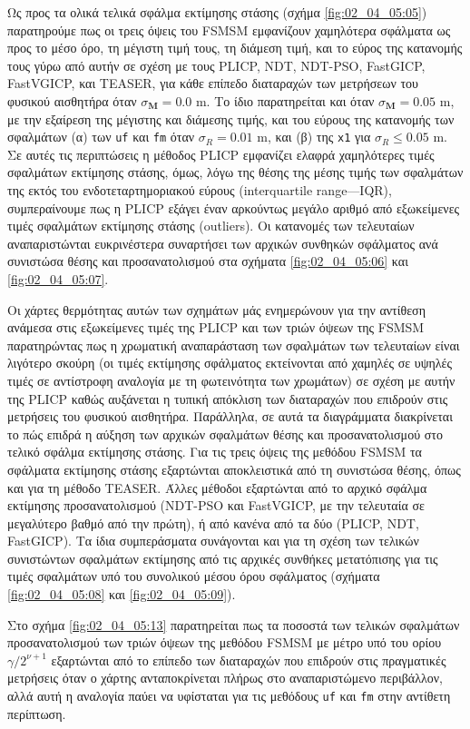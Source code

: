 Ως προς τα ολικά τελικά σφάλμα εκτίμησης στάσης (σχήμα \ref{fig:02_04_05:05})
παρατηρούμε πως οι τρεις όψεις του FSMSM εμφανίζουν χαμηλότερα σφάλματα ως προς
το μέσο όρο, τη μέγιστη τιμή τους, τη διάμεση τιμή, και το εύρος της κατανομής
τους γύρω από αυτήν σε σχέση με τους PLICP, NDT, NDT-PSO, FastGICP, FastVGICP,
και TEASER, για κάθε επίπεδο διαταραχών των μετρήσεων του φυσικού αισθητήρα
όταν $\sigma_{\bm{M}} = 0.0$ m. Το ίδιο παρατηρείται και όταν $\sigma_{\bm{M}}
= 0.05$ m, με την εξαίρεση της μέγιστης και διάμεσης τιμής, και του εύρους της
κατανομής των σφαλμάτων (α) των \texttt{uf} και \texttt{fm} όταν $\sigma_R =
0.01$ m, και (β) της \texttt{x1} για $\sigma_R \leq 0.05$ m. Σε αυτές τις
περιπτώσεις η μέθοδος PLICP εμφανίζει ελαφρά χαμηλότερες τιμές σφαλμάτων
εκτίμησης στάσης, όμως, λόγω της θέσης της μέσης τιμής των σφαλμάτων της εκτός
του ενδοτεταρτημοριακού εύρους (interquartile range---IQR), συμπεραίνουμε πως η
PLICP εξάγει έναν αρκούντως μεγάλο αριθμό από εξωκείμενες τιμές σφαλμάτων
εκτίμησης στάσης (outliers). Οι κατανομές των τελευταίων αναπαριστώνται
ευκρινέστερα συναρτήσει των αρχικών συνθηκών σφάλματος ανά συνιστώσα θέσης και
προσανατολισμού στα σχήματα \ref{fig:02_04_05:06} και \ref{fig:02_04_05:07}.

Οι χάρτες θερμότητας αυτών των σχημάτων μάς ενημερώνουν για την αντίθεση
ανάμεσα στις εξωκείμενες τιμές της PLICP και των τριών όψεων της FSMSM
παρατηρώντας πως η χρωματική αναπαράσταση των σφαλμάτων των τελευταίων είναι
λιγότερο σκούρη (οι τιμές εκτίμησης σφάλματος εκτείνονται από χαμηλές σε υψηλές
τιμές σε αντίστροφη αναλογία με τη φωτεινότητα των χρωμάτων) σε σχέση με αυτήν
της PLICP καθώς αυξάνεται η τυπική απόκλιση των διαταραχών που επιδρούν στις
μετρήσεις του φυσικού αισθητήρα. Παράλληλα, σε αυτά τα διαγράμματα διακρίνεται
το πώς επιδρά η αύξηση των αρχικών σφαλμάτων θέσης και προσανατολισμού στο
τελικό σφάλμα εκτίμησης στάσης. Για τις τρεις όψεις της μεθόδου FSMSM τα
σφάλματα εκτίμησης στάσης εξαρτώνται αποκλειστικά από τη συνιστώσα θέσης, όπως
και για τη μέθοδο TEASER. Άλλες μέθοδοι εξαρτώνται από το αρχικό σφάλμα
εκτίμησης προσανατολισμού (NDT-PSO και FastVGICP, με την τελευταία σε
μεγαλύτερο βαθμό από την πρώτη), ή από κανένα από τα δύο (PLICP, NDT,
FastGICP). Τα ίδια συμπεράσματα συνάγονται και για τη σχέση των τελικών
συνιστώντων σφαλμάτων εκτίμησης από τις αρχικές συνθήκες μετατόπισης για τις
τιμές σφαλμάτων υπό του συνολικού μέσου όρου σφάλματος (σχήματα
\ref{fig:02_04_05:08} και \ref{fig:02_04_05:09}).

Στο σχήμα \ref{fig:02_04_05:13} παρατηρείται πως τα ποσοστά των τελικών
σφαλμάτων προσανατολισμού των τριών όψεων της μεθόδου FSMSM με μέτρο υπό του
ορίου $\gamma / 2^{\nu+1}$ εξαρτώνται από το επίπεδο των διαταραχών που
επιδρούν στις πραγματικές μετρήσεις όταν ο χάρτης ανταποκρίνεται πλήρως στο
αναπαριστώμενο περιβάλλον, αλλά αυτή η αναλογία παύει να υφίσταται για τις
μεθόδους \texttt{uf} και \texttt{fm} στην αντίθετη περίπτωση.
